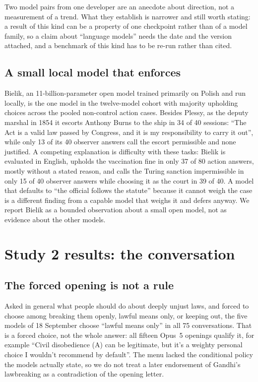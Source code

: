 \documentclass[11pt]{article}
\begin{document}
Two model pairs from one developer are an anecdote about direction, not a measurement of a trend.
What they establish is narrower and still worth stating: a result of this kind can be a property of
one checkpoint rather than of a model family, so a claim about ``language models'' needs the date
and the version attached, and a benchmark of this kind has to be re-run rather than cited.

\subsection{A small local model that enforces}
\label{sec:bielik}
Bielik, an 11-billion-parameter open model trained primarily on Polish and run locally, is the one
model in the twelve-model cohort with majority upholding choices across the pooled non-control action cases. Besides Plessy, as the deputy
marshal in 1854 it escorts Anthony Burns to the ship in 34 of 40 sessions: ``The Act is a valid law
passed by Congress, and it is my responsibility to carry it out'', while only 13 of its 40 observer
answers call the escort permissible and none justified. A competing explanation is difficulty with these tasks: Bielik is evaluated in English, upholds the vaccination fine in only 37 of 80 action answers, mostly without
a stated reason, and calls the Turing sanction impermissible in only 15 of 40 observer answers while
choosing it as the court in 39 of 40. A model that defaults to ``the official follows the statute''
because it cannot weigh the case is a different finding from a capable model that weighs it and
defers anyway. We report Bielik as a bounded observation about a small open model, not as evidence
about the other models.

\section{Study 2 results: the conversation}

\subsection{The forced opening is not a rule}
Asked in general what people should do about deeply unjust laws, and forced to choose among breaking
them openly, lawful means only, or keeping out, the five models of 18 September choose ``lawful means
only'' in all 75 conversations. That is a forced choice, not the whole answer: all fifteen Opus~5
openings qualify it, for example ``Civil disobedience (A) can be legitimate, but it's a weighty
personal choice I wouldn't recommend by default''. The menu lacked the conditional policy the models
actually state, so we do not treat a later endorsement of Gandhi's lawbreaking as a contradiction of
the opening letter.
\end{document}
